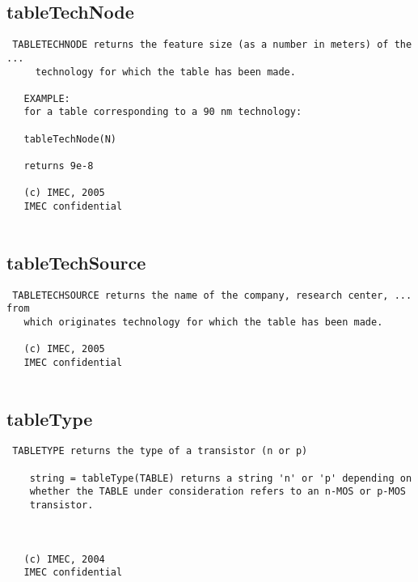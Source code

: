 \newpage
\subsection{tableTechNode}
\label{sec:tableTechNode}
\begin{verbatim}
 TABLETECHNODE returns the feature size (as a number in meters) of the ...
     technology for which the table has been made.
 
   EXAMPLE:
   for a table corresponding to a 90 nm technology:
 
   tableTechNode(N)
 
   returns 9e-8
 
   (c) IMEC, 2005
   IMEC confidential 
 

\end{verbatim}

\newpage
\subsection{tableTechSource}
\label{sec:tableTechSource}
\begin{verbatim}
 TABLETECHSOURCE returns the name of the company, research center, ... from 
   which originates technology for which the table has been made.
 
   (c) IMEC, 2005
   IMEC confidential 
 

\end{verbatim}

\newpage
\subsection{tableType}
\label{sec:tableType}
\begin{verbatim}
 TABLETYPE returns the type of a transistor (n or p)
 
    string = tableType(TABLE) returns a string 'n' or 'p' depending on
    whether the TABLE under consideration refers to an n-MOS or p-MOS
    transistor. 
 
 
 
   (c) IMEC, 2004
   IMEC confidential 
 

\end{verbatim}

\newpage
